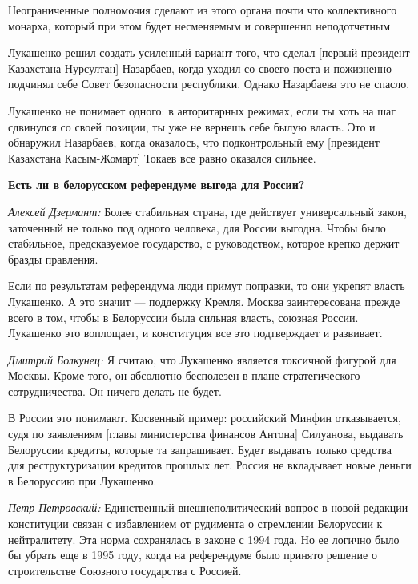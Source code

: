 \begin{fancyquotes}
    Неограниченные полномочия сделают из этого органа почти что коллективного монарха, который при этом будет несменяемым и совершенно неподотчетным
\end{fancyquotes}

Лукашенко решил создать усиленный вариант того, что сделал [первый президент Казахстана Нурсултан] Назарбаев, когда уходил со своего поста и пожизненно подчинял себе Совет безопасности республики. Однако Назарбаева это не спасло.

Лукашенко не понимает одного: в авторитарных режимах, если ты хоть на шаг сдвинулся со своей позиции, ты уже не вернешь себе былую власть. Это и обнаружил Назарбаев, когда оказалось, что подконтрольный ему [президент Казахстана Касым-Жомарт] Токаев все равно оказался сильнее.

\textbf{Есть ли в белорусском референдуме выгода для России?}

\textit{Алексей Дзермант:} Более стабильная страна, где действует универсальный закон, заточенный не только под одного человека, для России выгодна. Чтобы было стабильное, предсказуемое государство, с руководством, которое крепко держит бразды правления.

Если по результатам референдума люди примут поправки, то они укрепят власть Лукашенко. А это значит — поддержку Кремля. Москва заинтересована прежде всего в том, чтобы в Белоруссии была сильная власть, союзная России. Лукашенко это воплощает, и конституция все это подтверждает и развивает.

\textit{Дмитрий Болкунец:} Я считаю, что Лукашенко является токсичной фигурой для Москвы. Кроме того, он абсолютно бесполезен в плане стратегического сотрудничества. Он ничего делать не будет.

В России это понимают. Косвенный пример: российский Минфин отказывается, судя по заявлениям [главы министерства финансов Антона] Силуанова, выдавать Белоруссии кредиты, которые та запрашивает. Будет выдавать только средства для реструктуризации кредитов прошлых лет. Россия не вкладывает новые деньги в Белоруссию при Лукашенко.

\textit{Петр Петровский:} Единственный внешнеполитический вопрос в новой редакции конституции связан с избавлением от рудимента о стремлении Белоруссии к нейтралитету. Эта норма сохранялась в законе с 1994 года. Но ее логично было бы убрать еще в 1995 году, когда на референдуме было принято решение о строительстве Союзного государства с Россией.

